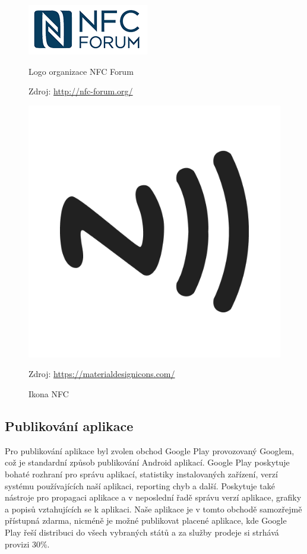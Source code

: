 \documentclass[czech,master,public,dept460,male,java,cpdeclaration]{diploma}
\begin{document}
\begin{figure}[H]
\begin{minipage}{.5\textwidth}
\centering
                \includegraphics[scale=0.4]{img/nfc-forum-logo.png}
        \caption{Logo organizace NFC Forum}
        \label{fig:nfcforumlogo}
        \centering Zdroj: \url{http://nfc-forum.org/}
\end{minipage}
\begin{minipage}{.5\textwidth}
\centering
                \includegraphics[scale=0.07]{img/nfc-icon.png}
        \caption{Ikona NFC}
        \centering Zdroj: \url{https://materialdesignicons.com/}
        \label{fig:nfcicon}
    \end{minipage}
\end{figure}

\subsection{Publikování aplikace}
Pro publikování aplikace byl zvolen obchod Google Play provozovaný Googlem, což je standardní způsob
publikování Android aplikací. Google Play poskytuje bohaté rozhraní pro správu aplikací, statistiky
instalovaných zařízení, verzí systému používajících naší aplikaci, reporting chyb a další. Poskytuje také
nástroje pro propagaci aplikace a v neposlední řadě správu verzí aplikace, grafiky a popisů
vztahujících se k aplikaci. Naše aplikace je v tomto obchodě samozřejmě přístupná zdarma, nicméně
je možné publikovat placené aplikace, kde Google Play řeší distribuci do všech vybraných států a za služby
prodeje si strhává provizi 30\%.
\end{document}
